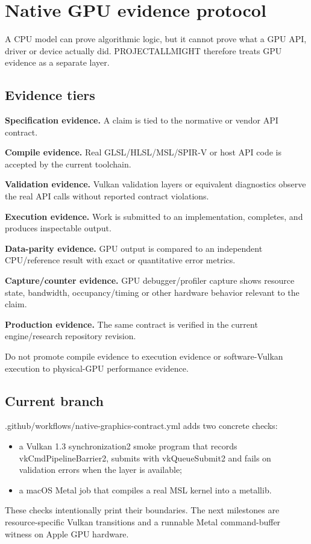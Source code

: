 \hypertarget{appendix-1680333ac796}{}\label{referencestart:appendix-1680333ac796}
\section{Native GPU evidence protocol}\label{appendix-1680333ac796-native-gpu-evidence-protocol}

A CPU model can prove algorithmic logic, but it cannot prove what a GPU API, driver or device actually did. PROJECTALLMIGHT therefore treats GPU evidence as a separate layer.

\subsection{Evidence tiers}\label{appendix-1680333ac796-evidence-tiers}

\textbf{Specification evidence.} A claim is tied to the normative or vendor API contract.

\textbf{Compile evidence.} Real GLSL/HLSL/MSL/SPIR-V or host API code is accepted by the current toolchain.

\textbf{Validation evidence.} Vulkan validation layers or equivalent diagnostics observe the real API calls without reported contract violations.

\textbf{Execution evidence.} Work is submitted to an implementation, completes, and produces inspectable output.

\textbf{Data-parity evidence.} GPU output is compared to an independent CPU/reference result with exact or quantitative error metrics.

\textbf{Capture/counter evidence.} GPU debugger/profiler capture shows resource state, bandwidth, occupancy/timing or other hardware behavior relevant to the claim.

\textbf{Production evidence.} The same contract is verified in the current engine/research repository revision.

Do not promote compile evidence to execution evidence or software-Vulkan execution to physical-GPU performance evidence.

\subsection{Current branch}\label{appendix-1680333ac796-current-branch}

.github/workflows/native-graphics-contract.yml adds two concrete checks:

\begin{itemize}
\tightlist
\item
  a Vulkan 1.3 synchronization2 smoke program that records vkCmdPipelineBarrier2, submits with vkQueueSubmit2 and fails on validation errors when the layer is available;
\item
  a macOS Metal job that compiles a real MSL kernel into a metallib.
\end{itemize}

These checks intentionally print their boundaries. The next milestones are resource-specific Vulkan transitions and a runnable Metal command-buffer witness on Apple GPU hardware.
